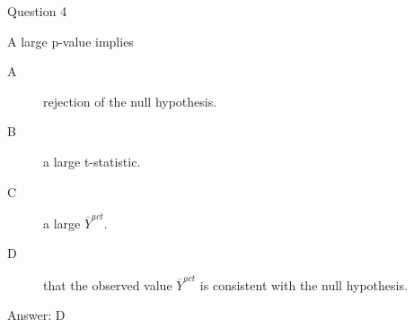\documentclass[presentation,10pt]{beamer}
\begin{document}
\begin{frame}[label={sec:orga81a024}]{Question 4}
\begin{block}{A large p-value implies}
\begin{description}
\item[{A}] rejection of the null hypothesis.
\item[{B}] a large t-statistic.
\item[{C}] a large \(\overline{Y}^{act}\).
\item[{D}] that the observed value \(\overline{Y}^{act}\) is consistent with
the null hypothesis.
\end{description}
\vspace{1cm}
\pause
\alert{Answer: D}
\end{block}
\end{frame}
\end{document}
